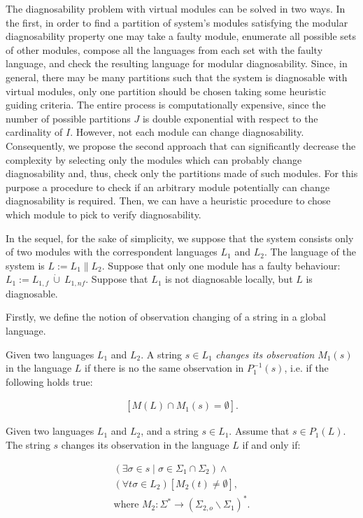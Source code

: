 \documentclass[letterpaper, 10pt, conference]{ieeeconf}
\begin{document}
The diagnosability problem with virtual modules can be solved in two ways.
In the first, in order to find a partition of system's modules satisfying the
modular diagnosability property one may take a faulty module, enumerate all possible
sets of other modules, compose all the languages from each set with the faulty
language, and check the resulting language for modular diagnosability. Since, in
general, there may be many partitions such that the system is diagnosable with
virtual modules, only one partition should be chosen taking some
heuristic guiding criteria. The entire process is computationally expensive,
since the number of possible partitions $J$ is double exponential with respect
to the cardinality of $I$.
However, not each module can change diagnosability. Consequently, we propose the
second approach that can significantly decrease the complexity by selecting only
the modules which can probably change diagnosability and, thus, check only the
partitions made of such modules. For this purpose a procedure to check if an
arbitrary module potentially can change diagnosability is required. Then, we can
have a heuristic procedure to chose which module to pick to verify
diagnosability.

In the sequel, for the sake of simplicity, we suppose that the system consists
only of two modules with the correspondent languages $L_1$ and $L_2$. The
language of the system is $L := L_1 \parallel L_2$. Suppose that only one module
has a faulty behaviour: $L_1 := L_{1,f} ~\dot{\cup}~ L_{1,nf}$.
Suppose that $L_1$ is not diagnosable locally, but $L$ is diagnosable.

Firstly, we define the notion of observation changing of a string in a global
language.
\begin{definition}Given two languages $L_1$ and $L_2$. A string $s \in
L_1$ \emph{changes its observation} $M_1(s)$ in the language $L$ if
there is no the same observation in $P_1^{-1}(s)$, i.e.
if the following holds true:
\end{definition}
\begin{equation}
\label{def:obs}
\begin{array}{l}
	\left[ M(L) \cap M_1(s) = \emptyset \right].
\end{array}
\end{equation}

\begin{lemma}
\label{lem_changed_observation}
Given two languages $L_1$ and $L_2$, and a string $s \in L_1$.
Assume that $s \in P_1(L)$. The string $s$ changes its observation in the
language $L$ if and only if:
\end{lemma}
\begin{subequations}\label{lem:obs}
\begin{align}
	(\exists \sigma \in s \mid \sigma \in \Sigma_1 \cap \Sigma_2) \land
	\label{lem:obs1}
	\\
	(\forall t\sigma \in L_2)
	\left[M_2(t) \neq \emptyset \right],
	\label{lem:obs2}
	\\
	\textrm{where } M_2: \Sigma^* \rightarrow (\Sigma_{2,o} \backslash
	\Sigma_1)^*. 
	\label{lem:obs3}
\end{align}
\end{subequations}
\end{document}
